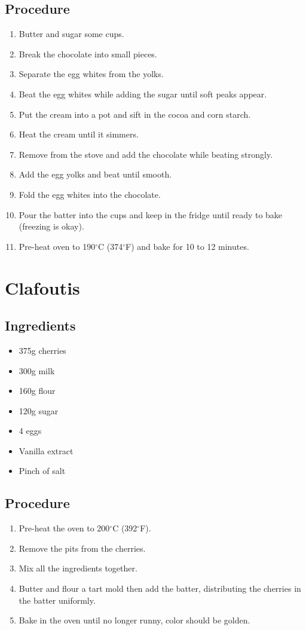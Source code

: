 \documentclass[10pt]{book}
\newcommand{\degree}{$^\circ$}
\begin{document}
\subsection*{Procedure}
	\begin{enumerate}
		\item Butter and sugar some cups.
		\item Break the chocolate into small pieces.
		\item Separate the egg whites from the yolks.
		\item Beat the egg whites while adding the sugar until soft peaks appear.
		\item Put the cream into a pot and sift in the cocoa and corn starch.
		\item Heat the cream until it simmers.
		\item Remove from the stove and add the chocolate while beating strongly.
		\item Add the egg yolks and beat until smooth.
		\item Fold the egg whites into the chocolate.
		\item Pour the batter into the cups and keep in the fridge until ready to bake (freezing is okay).
		\item Pre-heat oven to 190{\degree}C (374{\degree}F) and bake for 10 to 12 minutes.
	\end{enumerate}
\newpage


\newpage
\section*{Clafoutis}
\subsection*{Ingredients}
	\begin{itemize}
		\item 375g cherries
		\item 300g milk
		\item 160g flour
		\item 120g sugar
		\item 4 eggs
		\item Vanilla extract
		\item Pinch of salt
	\end{itemize}
\subsection*{Procedure}
	\begin{enumerate}
		\item Pre-heat the oven to 200{\degree}C (392{\degree}F).
		\item Remove the pits from the cherries.
		\item Mix all the ingredients together.
		\item Butter and flour a tart mold then add the batter, distributing the cherries in the batter uniformly.
		\item Bake in the oven until no longer runny, color should be golden.
	\end{enumerate}
\newpage
\end{document}
